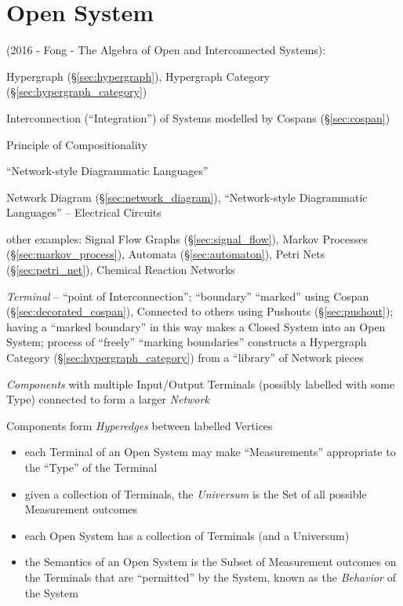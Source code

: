 \section{Open System}\label{sec:open_system}

(2016 - Fong - The Algebra of Open and Interconnected Systems):

\fist Hypergraph (\S\ref{sec:hypergraph}), Hypergraph Category
(\S\ref{sec:hypergraph_category})

Interconnection (``Integration'') of Systems modelled by Cospans
(\S\ref{sec:cospan})

Principle of Compositionality

``Network-style Diagrammatic Languages''

Network Diagram (\S\ref{sec:network_diagram}), ``Network-style
Diagrammatic Languages'' -- Electrical Circuits

other examples: Signal Flow Graphs (\S\ref{sec:signal_flow}),
Markov Processes (\S\ref{sec:markov_process}), Automata
(\S\ref{sec:automaton}), Petri Nets (\S\ref{sec:petri_net}), Chemical
Reaction Networks

\emph{Terminal} -- ``point of Interconnection''; ``boundary''
``marked'' using Cospan (\S\ref{sec:decorated_cospan}), Connected to
others using Pushouts (\S\ref{sec:pushout}); having a ``marked
boundary'' in this way makes a Closed System into an Open System;
process of ``freely''  ``marking boundaries'' constructs a Hypergraph
Category (\S\ref{sec:hypergraph_category}) from a ``library'' of
Network pieces

\emph{Components} with multiple Input/Output Terminals (possibly
labelled with some Type) connected to form a larger \emph{Network}

Components form \emph{Hyperedges} between labelled Vertices

\begin{itemize}
  \item each Terminal of an Open System may make ``Measurements''
    appropriate to the ``Type'' of the Terminal
  \item given a collection of Terminals, the \emph{Universum} is the
    Set of all possible Measurement outcomes
  \item each Open System has a collection of Terminals (and a Universum)
  \item the Semantics of an Open System is the Subset of Measurement
    outcomes on the Terminals that are ``permitted'' by the System,
    known as the \emph{Behavior} of the System
\end{itemize}

